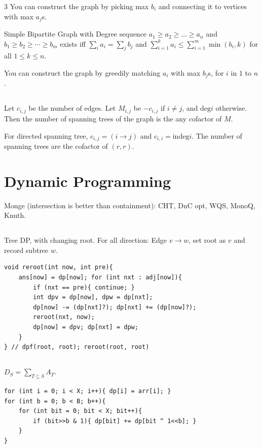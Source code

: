 \documentclass[landscape, 8pt, a4paper, oneside]{extarticle}
\begin{document}
\begin{multicols*}{3}
You can construct the graph by picking max $b_i$ and connecting it to vertices with max $a_j$s.

Simple Bipartite Graph with Degree sequence $a_1 \ge a_2 \ge \ldots \ge a_n$ and $b_1 \ge b_2 \ge \cdots \ge b_m$ exists iff $\sum_i a_i = \sum_j b_j$ and $\sum_{i=1}^{k} a_i \le \sum_{i=1}^{m} \min(b_i, k)$ for all $1 \le k \le n$.

You can construct the graph by greedily matching $a_i$ with max $b_j$s, for $i$ in $1$ to $n$.
\subsection{}
Let $c_{i, j}$ be the number of edges. Let $M_{i, j}$ be $-c_{i, j}$ if $i \neq j$, and $\mathrm{deg} i$ otherwise.
Then the number of spanning trees of the graph is the any cofactor of $M$.

For directed spanning tree, $c_{i, j} = (i \rightarrow j)$ and $c_{i, i} = \mathrm{indeg} i$.
The number of spanning trees are the cofactor of $(r, r)$.
\section{Dynamic Programming}
Monge (intersection is better than containment): CHT, DnC opt, WQS, MonoQ, Knuth.
\subsection{}
Tree DP, with changing root. For all direction: Edge $v \rightarrow w$, set root as $v$ and record subtree $w$.

\begin{verbatim}
void reroot(int now, int pre){
	ans[now] = dp[now]; for (int nxt : adj[now]){
		if (nxt == pre){ continue; }
		int dpv = dp[now], dpw = dp[nxt];
		dp[now] -= (dp[nxt]?); dp[nxt] += (dp[now]?);
		reroot(nxt, now);
		dp[now] = dpv; dp[nxt] = dpw;
	}
} // dpf(root, root); reroot(root, root)
\end{verbatim}
\subsection{}
$D_S = \sum_{T \subseteq S} A_T$.

\begin{verbatim}
for (int i = 0; i < X; i++){ dp[i] = arr[i]; }
for (int b = 0; b < B; b++){
	for (int bit = 0; bit < X; bit++){
		if (bit>>b & 1){ dp[bit] += dp[bit ^ 1<<b]; }
	}
}
\end{verbatim}

\end{multicols*}
\end{document}

